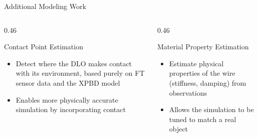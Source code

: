 \documentclass[aspectratio=169]{beamer}
\begin{document}
\begin{frame}{Additional Modeling Work}

  \begin{columns}[T]

    \begin{column}{0.46\textwidth}
      \begin{block}{Contact Point Estimation}
        \begin{itemize}
          \item Detect where the DLO makes contact with its environment, based purely on FT sensor data and the XPBD model
          \item Enables more physically accurate simulation by incorporating contact
        \end{itemize}
      \end{block}
    \end{column}

    \begin{column}{0.46\textwidth}
      \begin{block}{Material Property Estimation}
        \begin{itemize}
          \item Estimate physical properties of the wire (stiffness, damping) from observations
          \item Allows the simulation to be tuned to match a real object
        \end{itemize}
      \end{block}
    \end{column}

  \end{columns}
\end{frame}
\end{document}
